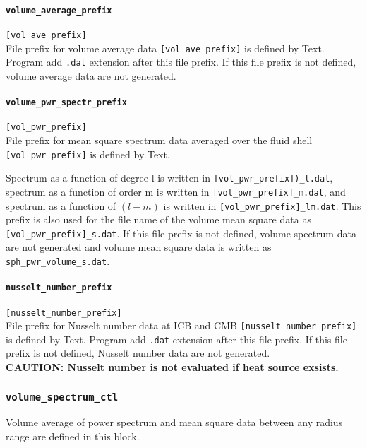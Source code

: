 \paragraph{\tt volume\_average\_prefix}
\label{href_t:volume_average_prefix}
\verb|[vol_ave_prefix]| \\
File prefix for volume average data \verb|[vol_ave_prefix]| is defined by Text. Program add {\tt .dat} extension after this file prefix. If this file prefix is not defined, volume average data are not generated. 

\paragraph{\tt volume\_pwr\_spectr\_prefix}
\label{href_t:volume_pwr_spectr_prefix}
\verb|[vol_pwr_prefix]| \\
File prefix for mean square spectrum data averaged over the fluid shell \verb|[vol_pwr_prefix]| is defined by Text. 

Spectrum as a function of degree {l} is written in \verb|[vol_pwr_prefix])_l.dat|, spectrum as a function of order {m} is written in \verb|[vol_pwr_prefix]_m.dat|, and spectrum as a function of $(l-m)$ is written in \verb|[vol_pwr_prefix]_lm.dat|. This prefix is also used for the file name of the volume mean square data as \verb|[vol_pwr_prefix]_s.dat|.
If this file prefix is not defined, volume spectrum data are not generated and volume mean square data is written as \verb|sph_pwr_volume_s.dat|.

\paragraph{\tt nusselt\_number\_prefix}
\label{href_t:gauss_coefs_prefix}
\verb|[nusselt_number_prefix]| \\
File prefix for Nusselt number data at ICB and CMB \verb|[nusselt_number_prefix]| is defined by Text. Program add {\tt .dat} extension after this file prefix. If this file prefix is not defined, Nusselt number data are not generated. \\
{\bf CAUTION: Nusselt number is not evaluated if heat source exsists.}

%
\subsubsection{\tt volume\_spectrum\_ctl}
\label{href_t:volume_spectrum_ctl}
Volume average of power spectrum and mean square data between any radius range are defined in this block.

